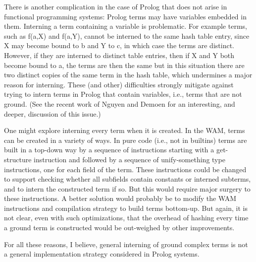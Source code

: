 \documentclass{llncs}
\begin{document}
There is another complication in the case of Prolog that does not
arise in functional programming systems: Prolog terms may have
variables embedded in them.  Interning a term containing a variable is
problematic.  For example terms, such as f(a,X) and f(a,Y), cannot be
interned to the same hash table entry, since X may become bound to b
and Y to c, in which case the terms are distinct.  However, if they
are interned to distinct table entries, then if X and Y both become
bound to a, the terms are then the same but in this situation there
are two distinct copies of the same term in the hash table, which
undermines a major reason for interning.  These (and other)
difficulties strongly mitigate against trying to intern terms in
Prolog that contain variables, i.e., terms that are not ground.  (See
the recent work of Nguyen and Demoen \cite{nguyen-demoen-rep-sharing}
for an interesting, and deeper, discussion of this issue.)

One might explore interning every term when it is created.  In the
WAM, terms can be created in a variety of ways.  In pure code (i.e.,
not in builtins) terms are built in a top-down way by a sequence of
instructions starting with a get-structure instruction and followed by
a sequence of unify-something type instructions, one for each field of
the term.  These instructions could be changed to support checking
whether all subfields contain constants or interned subterms, and to
intern the constructed term if so.  But this would require major
surgery to these instructions.  A better solution would probably be to
modify the WAM instructions and compilation strategy to build terms
bottom-up.  But again, it is not clear, even
with such optimizations, that the overhead of hashing every time a
ground term is constructed would be out-weighed by other improvements.

For all these reasons, I believe, general interning of ground complex
terms is not a general implementation strategy considered in Prolog
systems.
\end{document}
